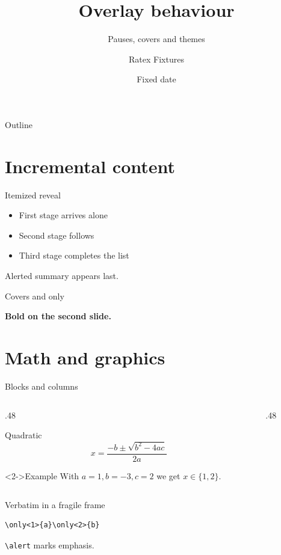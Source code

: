 \documentclass[aspectratio=169,10pt]{beamer}
\title{Overlay behaviour}
\subtitle{Pauses, covers and themes}
\author{Ratex Fixtures}
\institute{Typesetting Lab}
\date{Fixed date}
\begin{document}
\begin{frame}
  \titlepage
\end{frame}
\begin{frame}{Outline}
  \tableofcontents
\end{frame}

\section{Incremental content}
\begin{frame}{Itemized reveal}
  \begin{itemize}[<+->]
    \item First stage arrives alone
    \item Second stage follows
    \item Third stage completes the list
  \end{itemize}
  \pause
  \alert{Alerted summary appears last.}
\end{frame}

\begin{frame}{Covers and only}
  \par
  \par
  \par
  \textbf<2>{Bold on the second slide.}
\end{frame}

\section{Math and graphics}
\begin{frame}{Blocks and columns}
  \begin{columns}[T]
    \begin{column}{.48\textwidth}
      \begin{block}{Quadratic}
        \[x=\frac{-b\pm\sqrt{b^{2}-4ac}}{2a}\]
      \end{block}
      \begin{exampleblock}<2->{Example}
        With $a=1,b=-3,c=2$ we get $x\in\{1,2\}$.
      \end{exampleblock}
    \end{column}
    \begin{column}{.48\textwidth}
    \end{column}
  \end{columns}
\end{frame}
\begin{frame}[fragile]{Verbatim in a fragile frame}
  \begin{verbatim}
\only<1>{a}\only<2>{b}
  \end{verbatim}
  \texttt{\textbackslash alert} marks \alert{emphasis}.
\end{frame}
\end{document}

